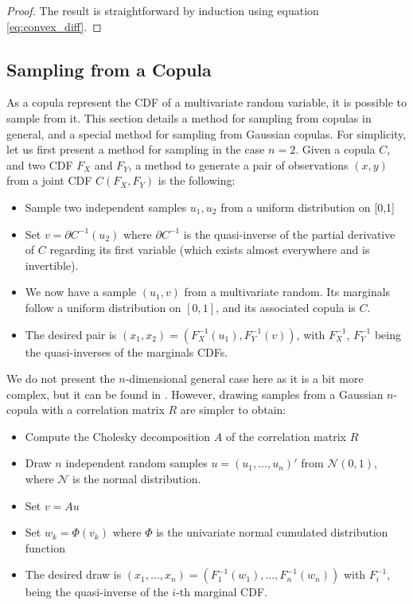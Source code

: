 \begin{proof}
    The result is straightforward by induction using equation \eqref{eq:convex_diff}.
\end{proof}

\subsection{Sampling from a Copula}\label{sec:sampling_copula}
As a copula represent the CDF of a multivariate random variable, it is possible to sample from it. This section details a method for sampling from copulas in general, and a special method for sampling from Gaussian copulas. For simplicity, let us first present a method for sampling in the case $n=2$. Given a copula $C$, and two CDF $F_X$ and $F_Y$, a method to generate a pair of observations $(x, y)$ from a joint CDF $C(F_X, F_Y)$ is the following:

\begin{itemize}
    \item Sample two independent samples $u_1, u_2$ from a uniform distribution on [0,1]
    \item Set $v=\partial C^{-1}(u_2)$ where $\partial C^{-1}$ is the quasi-inverse of the partial derivative of $C$ regarding its first variable (which exists almost everywhere and is invertible).
    \item We now have a sample $(u_1, v)$ from a multivariate random. Its marginals follow a uniform distribution on $[0,1]$, and its associated copula is $C$.
    \item The desired pair is $(x_1,x_2) = (F^{-1}_X(u_1), F^{-1}_Y(v))$, with $F_X^{-1}$, $F_Y^{-1}$ being the quasi-inverses of the marginals CDFs.
\end{itemize}

We do not present the $n$-dimensional general case here as it is a bit more complex, but it can be found in \cite{cherubini_copula_2004}. However, drawing samples from a Gaussian $n$-copula with a correlation matrix $R$ are simpler to obtain:
\begin{itemize}
    \item Compute the Cholesky decomposition $A$ of the correlation matrix $R$
    \item Draw $n$ independent random samples $u=(u_1, \dots, u_n)'$ from $\mathcal{N}(0,1)$, where $\mathcal{N}$ is the normal distribution.
    \item Set $v=Au$
    \item Set $w_k=\Phi(v_k)$ where $\Phi$ is the univariate normal cumulated distribution function
    \item The desired draw is $(x_1,\dots, x_n)=(F^{-1}_1(w_1), \dots, F^{-1}_n(w_n))$ with $F_i^{-1}$, being the quasi-inverse of the $i$-th marginal CDF.
\end{itemize}

